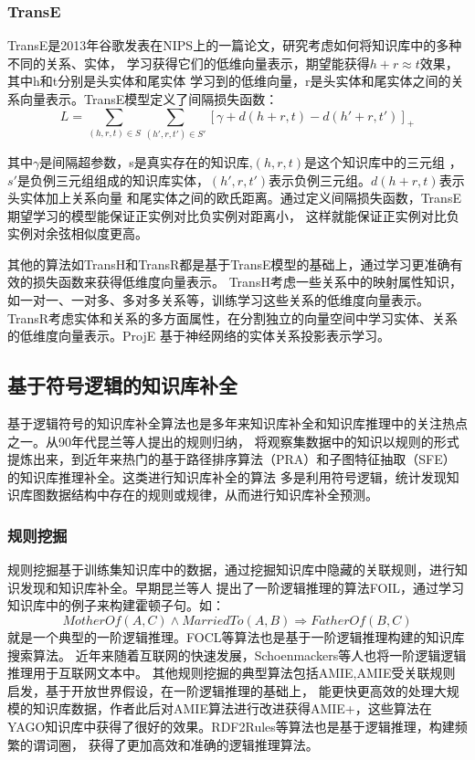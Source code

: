\subsubsection{TransE}
TransE是2013年谷歌发表在NIPS上的一篇论文，研究考虑如何将知识库中的多种不同的关系、实体，
学习获得它们的低维向量表示，期望能获得$h+r\approx t$效果，其中h和t分别是头实体和尾实体
学习到的低维向量，r是头实体和尾实体之间的关系向量表示。TransE模型定义了间隔损失函数：
$$L=\sum_{(h,r,t)\in S} \sum_{(h',r,t')\in S'}[\gamma+d(h+r,t)-d(h'+r,t')]_{+}$$

其中$\gamma$是间隔超参数，s是真实存在的知识库,$(h,r,t)$是这个知识库中的三元组
，$s'$是负例三元组组成的知识库实体，$(h',r,t')$表示负例三元组。$d(h+r,t)$表示头实体加上关系向量
和尾实体之间的欧氏距离。通过定义间隔损失函数，TransE期望学习的模型能保证正实例对比负实例对距离小，
这样就能保证正实例对比负实例对余弦相似度更高。

其他的算法如TransH和TransR都是基于TransE模型的基础上，通过学习更准确有效的损失函数来获得低维度向量表示。
TransH考虑一些关系中的映射属性知识，如一对一、一对多、多对多关系等，训练学习这些关系的低维度向量表示。
TransR\cite{Lin2015LearningEA}考虑实体和关系的多方面属性，在分割独立的向量空间中学习实体、关系的低维度向量表示。ProjE\cite{Shi2017ProjEEP}
基于神经网络的实体关系投影表示学习。

\subsection{基于符号逻辑的知识库补全}
\label{cha:symbolic}
基于逻辑符号的知识库补全算法也是多年来知识库补全和知识库推理中的关注热点之一。从90年代昆兰等人提出的规则归纳，
将观察集数据中的知识以规则的形式提炼出来，到近年来热门的基于路径排序算法（PRA）和子图特征抽取（SFE）的知识库推理补全。这类进行知识库补全的算法
多是利用符号逻辑，统计发现知识库图数据结构中存在的规则或规律，从而进行知识库补全预测。

\subsubsection{规则挖掘}
规则挖掘基于训练集知识库中的数据，通过挖掘知识库中隐藏的关联规则，进行知识发现和知识库补全。早期昆兰等人
提出了一阶逻辑推理的算法FOIL\cite{Quinlan1993FOILAM}，通过学习知识库中的例子来构建霍顿子句。如：
$$MotherOf(A,C)\land MarriedTo(A,B)\Rightarrow FatherOf(B,C)$$
就是一个典型的一阶逻辑推理。FOCL\cite{PAZZANI1991DetectingAC}等算法也是基于一阶逻辑推理构建的知识库搜索算法。
近年来随着互联网的快速发展，Schoenmackers\cite{Schoenmackers:2010}等人也将一阶逻辑逻辑推理用于互联网文本中。
其他规则挖掘的典型算法包括AMIE\cite{Galarraga2013},AMIE受关联规则启发，基于开放世界假设，在一阶逻辑推理的基础上，
能更快更高效的处理大规模的知识库数据，作者此后对AMIE算法进行改进获得AMIE+\cite{Galrraga2015FastRM}，这些算法在
YAGO知识库中获得了很好的效果。RDF2Rules\cite{Wang2015RDF2RulesLR}等算法也是基于逻辑推理，构建频繁的谓词圈，
获得了更加高效和准确的逻辑推理算法。

